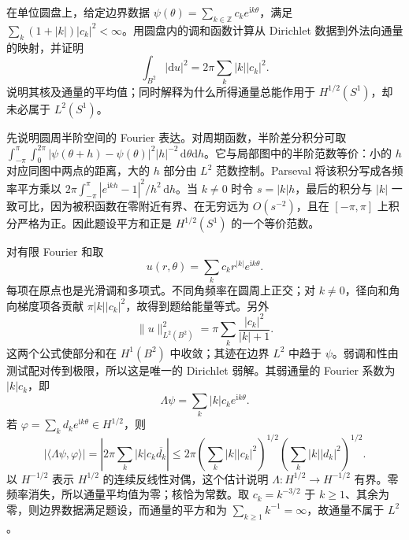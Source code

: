 \begin{exercise}\label{g3:ex:disk-dirichlet-neumann-map}
	在单位圆盘上，给定边界数据 \(\psi(\theta)=\sum_{k\in\mathbb Z}c_ke^{\mathrm ik\theta}\)，满足 \(\sum_k(1+|k|)|c_k|^2<\infty\)。用圆盘内的调和函数计算从 Dirichlet 数据到外法向通量的映射，并证明
	\[
		\int_{B^2}|\mathrm du|^2=2\pi\sum_k|k||c_k|^2.
	\]
	说明其核及通量的平均值；同时解释为什么所得通量总能作用于 \(H^{1/2}(S^1)\)，却未必属于 \(L^2(S^1)\)。
\end{exercise}
\begin{solution}
	先说明圆周半阶空间的 Fourier 表达。对周期函数，半阶差分积分可取 \(\int_{-\pi}^{\pi}\int_0^{2\pi}|\psi(\theta+h)-\psi(\theta)|^2|h|^{-2}\,\mathrm d\theta\mathrm dh\)。它与局部图中的半阶范数等价：小的 \(h\) 对应同图中两点的距离，大的 \(h\) 部分由 \(L^2\) 范数控制。Parseval 将该积分写成各频率平方乘以 \(2\pi\int_{-\pi}^{\pi}|e^{\mathrm ikh}-1|^2/h^2\,\mathrm dh\)。当 \(k\ne0\) 时令 \(s=|k|h\)，最后的积分与 \(|k|\) 一致可比，因为被积函数在零附近有界、在无穷远为 \(O(s^{-2})\)，且在 \([-\pi,\pi]\) 上积分严格为正。因此题设平方和正是 \(H^{1/2}(S^1)\) 的一个等价范数。

	对有限 Fourier 和取
	\[
		u(r,\theta)=\sum_kc_kr^{|k|}e^{\mathrm ik\theta}.
	\]
	每项在原点也是光滑调和多项式。不同角频率在圆周上正交；对 \(k\ne0\)，径向和角向梯度项各贡献 \(\pi|k||c_k|^2\)，故得到题给能量等式。另外
	\[
		\|u\|_{L^2(B^2)}^2=\pi\sum_k\frac{|c_k|^2}{|k|+1}.
	\]
	这两个公式使部分和在 \(H^1(B^2)\) 中收敛；其迹在边界 \(L^2\) 中趋于 \(\psi\)。弱调和性由测试配对传到极限，所以这是唯一的 Dirichlet 弱解。其弱通量的 Fourier 系数为 \(|k|c_k\)，即
	\[
		\Lambda\psi=\sum_k|k|c_ke^{\mathrm ik\theta}.
	\]
	若 \(\varphi=\sum_kd_ke^{\mathrm ik\theta}\in H^{1/2}\)，则
	\[
		|\langle\Lambda\psi,\varphi\rangle|
		=\left|2\pi\sum_k|k|c_k\overline{d_k}\right|
		\le2\pi\left(\sum_k|k||c_k|^2\right)^{1/2}
		\left(\sum_k|k||d_k|^2\right)^{1/2}.
	\]
	以 \(H^{-1/2}\) 表示 \(H^{1/2}\) 的连续反线性对偶，这个估计说明 \(\Lambda:H^{1/2}\to H^{-1/2}\) 有界。零频率消失，所以通量平均值为零；核恰为常数。取 \(c_k=k^{-3/2}\) 于 \(k\ge1\)、其余为零，则边界数据满足题设，而通量的平方和为 \(\sum_{k\ge1}k^{-1}=\infty\)，故通量不属于 \(L^2\)。
\end{solution}


